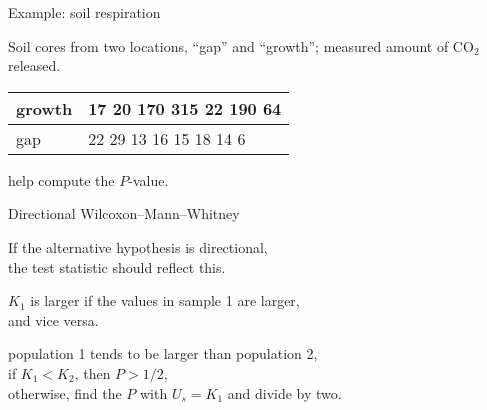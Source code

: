 \begin{frame}{Example: soil respiration}

  Soil cores from two locations, ``gap'' and ``growth'';
  measured amount of CO${}_2$ released.

  \begin{center}
  \begin{tabular}{l|p{2.5in}}
    growth & 17 \hspace{.25em} 20 \hspace{.25em} 170 \hspace{.25em} 315 \hspace{.25em} 22 \hspace{.25em} 190 \hspace{.25em} 64 \\
    \hline
    gap & 22 \hspace{.25em} 29 \hspace{.25em} 13 \hspace{.25em} 16 \hspace{.25em} 15 \hspace{.25em} 18 \hspace{.25em} 14 \hspace{.25em} 6 \\
  \end{tabular}

    \vspace{2em}

     help compute the $P$-value.

    \vspace{2em}


  \end{center}

\end{frame}

\begin{frame}{Directional Wilcoxon--Mann--Whitney}

  If the alternative hypothesis is \alert{directional}, \\
    the test statistic should reflect this.

    \vspace{2em}

     $K_1$ is larger if the values in sample 1 are larger, \\
    \hspace{2em} and vice versa.

    \vspace{2em}

     population 1 tends to be larger than population 2, \\
    \hspace{2em} if $K_1 < K_2$, then $P>1/2$, \\
    \hspace{2em} otherwise, find the $P$ with $U_s = K_1$ and divide by two.

\end{frame}

